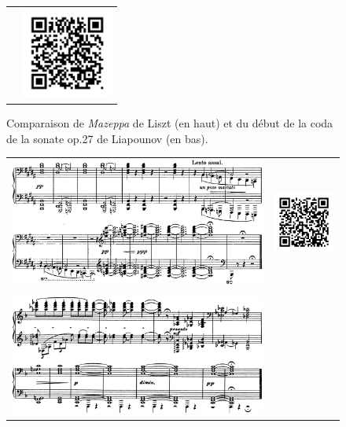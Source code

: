 \begin{figure}[!p]
\begin{bigcenter}
\begin{tabular}{lr}
      &
      \includegraphics[width=3cm, keepaspectratio]{sonate-qr.png}
    \end{tabular}
  \end{bigcenter}
  \caption{\label{sonate-coda}Comparaison de \emph{Mazeppa} de Liszt (en haut) et du début de la coda de la sonate op.27 de Liapounov (en bas).}
\end{figure}

\begin{figure}[!p]
  \begin{bigcenter}
    \begin{tabular}{lr}
      \vspace*{0.0cm}
      \includegraphics[width=12.5cm, keepaspectratio]{sonate-liszt-fin.png}
      &
      \includegraphics[width=3cm, keepaspectratio]{sonate-liszt-fin-qr.png}
      \\
      \vspace{0.5cm} &
      \\
      \includegraphics[width=12.5cm, keepaspectratio]{sonate-fin.png}

\end{tabular}
\end{bigcenter}
\end{figure}
